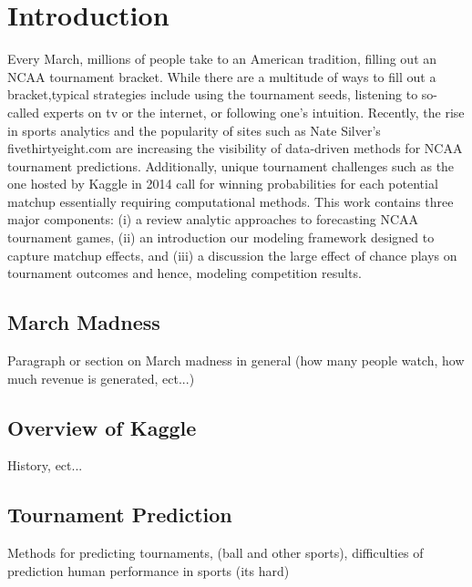 \section{Introduction}
 Every March, millions of people take to an American tradition, filling out an NCAA tournament bracket.  While there are a multitude of ways to fill out a bracket,typical strategies include using the tournament seeds, listening to so-called experts on tv or the internet, or following one's intuition.  Recently, the rise in sports analytics and the popularity of sites such as Nate Silver's fivethirtyeight.com are increasing the visibility of data-driven methods for NCAA tournament predictions.  Additionally, unique tournament challenges such as the one hosted by Kaggle in 2014 call for winning probabilities for each potential matchup essentially requiring computational methods.  This work contains three major components: (i) a review analytic approaches to forecasting NCAA tournament games, (ii) an introduction our modeling framework designed to capture matchup effects, and (iii) a discussion the large effect of chance plays on tournament outcomes and hence, modeling competition results.
   
\subsection{March Madness}  Paragraph or section on March madness in general (how many people watch, how much revenue is generated, ect...)
\subsection{Overview of Kaggle} History, ect...
\subsection{Tournament Prediction}
Methods for predicting tournaments, (ball and other sports), difficulties of prediction human performance in sports (its hard)
